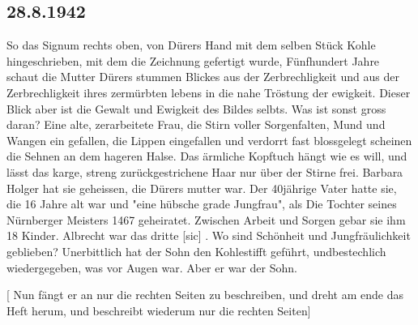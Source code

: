 \subsection{28.8.1942}

So das Signum rechts oben, von D\"{u}rers Hand mit dem selben St\"{u}ck Kohle hingeschrieben, mit dem die Zeichnung gefertigt wurde, F\"{u}nfhundert Jahre schaut die Mutter D\"{u}rers stummen Blickes aus der Zerbrechligkeit und aus der Zerbrechligkeit ihres zerm\"{u}rbten lebens in die nahe Tr\"{o}stung der ewigkeit.
Dieser Blick aber ist die Gewalt und Ewigkeit des Bildes selbts.
Was ist sonst gross daran?
Eine alte, zerarbeitete Frau, die Stirn voller Sorgenfalten, Mund und Wangen ein gefallen, die Lippen eingefallen und verdorrt fast blossgelegt scheinen die Sehnen an dem hageren Halse.
Das \"{a}rmliche Kopftuch h\"{a}ngt wie es will, und l\"{a}sst das karge, streng zur\"{u}ckgestrichene Haar nur \"{u}ber der Stirne frei.
Barbara Holger hat sie geheissen, die D\"{u}rers mutter war.
Der 40j\"{a}hrige Vater hatte sie, die 16 Jahre alt war und "eine h\"{u}bsche grade Jungfrau", als Die Tochter seines N\"{u}rnberger Meisters 1467 geheiratet.
Zwischen Arbeit und Sorgen gebar sie ihm 18 Kinder.
Albrecht war das dritte{\color{red} [sic] }.
Wo sind Sch\"{o}nheit und Jungfr\"{a}ulichkeit geblieben?
Unerbittlich hat der Sohn den Kohlestifft gef\"{u}hrt, undbestechlich wiedergegeben, was vor Augen war.
Aber er war der Sohn.

\vfill

{\color{red} [ Nun f\"{a}ngt er an nur die rechten Seiten zu beschreiben, und dreht am ende das Heft herum, und beschreibt wiederum nur die rechten Seiten] }

\clearpage
